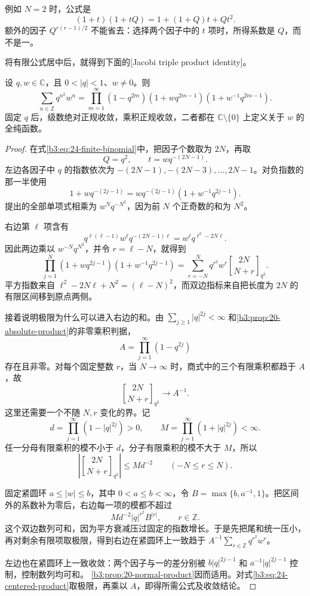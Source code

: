 例如 \(N=2\) 时，公式是
\[
 (1+t)(1+tQ)=1+(1+Q)t+Qt^2.
\]
额外的因子 \(Q^{r(r-1)/2}\) 不能省去：选择两个因子中的 \(t\) 项时，所得系数是 \(Q\)，而不是一。

将有限公式居中后，就得到下面的[Jacobi triple product identity]。

\begin{theorem}\label{b3:thm:24-triple-product}
设 \(q,w\in\mathbb C\)，且 \(0<|q|<1\)、\(w\ne0\)。则
\[
 \sum_{n\in\mathbb Z}q^{n^2}w^n
 =\prod_{m=1}^{\infty}
   (1-q^{2m})(1+wq^{2m-1})(1+w^{-1}q^{2m-1}).
\]
固定 \(q\) 后，级数绝对正规收敛，乘积正规收敛，二者都在
\(\mathbb C\setminus\{0\}\) 上定义关于 \(w\) 的全纯函数。
\end{theorem}
\begin{proof}
在式\eqref{b3:eq:24-finite-binomial}中，把因子个数取为 \(2N\)，再取
\[
 Q=q^2,\qquad t=wq^{-(2N-1)}.
\]
左边各因子中 \(q\) 的指数依次为
\(-(2N-1),-(2N-3),\ldots,2N-1\)。对负指数的那一半使用
\[
 1+wq^{-(2j-1)}
 =wq^{-(2j-1)}(1+w^{-1}q^{2j-1}).
\]
提出的全部单项式相乘为 \(w^Nq^{-N^2}\)，因为前 \(N\) 个正奇数的和为 \(N^2\)。

右边第 \(\ell\) 项含有
\[
 q^{\ell(\ell-1)}w^\ell q^{-(2N-1)\ell}
 =w^\ell q^{\ell^2-2N\ell}.
\]
因此两边乘以 \(w^{-N}q^{N^2}\)，并令 \(r=\ell-N\)，就得到
\begin{equation}\label{b3:eq:24-centered-product}
 \prod_{j=1}^N(1+wq^{2j-1})(1+w^{-1}q^{2j-1})
 =\sum_{r=-N}^N q^{r^2}w^r{2N\brack N+r}_{q^2}.
\end{equation}
平方指数来自 \(\ell^2-2N\ell+N^2=(\ell-N)^2\)，而双边指标来自把长度为 \(2N\) 的有限区间移到原点两侧。

接着说明极限为什么可以进入右边的和。由
\(\sum_{j\ge1}|q|^{2j}<\infty\) 和\cref{b3:prop:20-absolute-product}的非零乘积判据，
\[
 A=\prod_{j=1}^{\infty}(1-q^{2j})
\]
存在且非零。对每个固定整数 \(r\)，当 \(N\to\infty\) 时，商式中的三个有限乘积都趋于 \(A\)，故
\[
 {2N\brack N+r}_{q^2}\longrightarrow A^{-1}.
\]
这里还需要一个不随 \(N,r\) 变化的界。记
\[
 d=\prod_{j=1}^{\infty}(1-|q|^{2j})>0,\qquad
 M=\prod_{j=1}^{\infty}(1+|q|^{2j})<\infty.
\]
任一分母有限乘积的模不小于 \(d\)，分子有限乘积的模不大于 \(M\)，所以
\[
 \left|{2N\brack N+r}_{q^2}\right|
 \le Md^{-2}\qquad(-N\le r\le N).
\]

固定紧圆环 \(a\le|w|\le b\)，其中 \(0<a\le b<\infty\)，令
\(B=\max\{b,a^{-1},1\}\)。把区间外的系数补为零后，右边每一项的模都不超过
\[
 Md^{-2}|q|^{r^2}B^{|r|},\qquad r\in\mathbb Z.
\]
这个双边数列可和，因为平方衰减压过固定的指数增长。于是先把尾和统一压小，再对剩余有限项取极限，得到右边在紧圆环上一致趋于
\(A^{-1}\sum_{r\in\mathbb Z}q^{r^2}w^r\)。

左边也在紧圆环上一致收敛：两个因子与一的差分别被
\(b|q|^{2j-1}\) 和 \(a^{-1}|q|^{2j-1}\) 控制，控制数列均可和。
\cref{b3:prop:20-normal-product}因而适用。对式\eqref{b3:eq:24-centered-product}取极限，再乘以 \(A\)，即得所需公式及收敛结论。
\end{proof}


